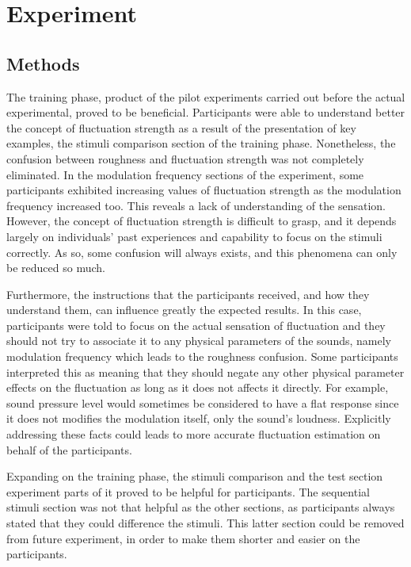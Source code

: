 \documentclass[../main.tex]{subfiles}
\begin{document}
\section{Experiment}

\subsection{Methods}

The training phase, product of the pilot experiments carried out before the
actual experimental, proved to be beneficial. Participants were able to
understand better the concept of fluctuation strength as a result of the
presentation of key examples, the stimuli comparison section of the training
phase. Nonetheless, the confusion between roughness and fluctuation strength was
not completely eliminated. In the modulation frequency sections of the
experiment, some participants exhibited increasing values of fluctuation
strength as the modulation frequency increased too. This reveals a lack of
understanding of the sensation. However, the concept of fluctuation strength is
difficult to grasp, and it depends largely on individuals' past experiences and
capability to focus on the stimuli correctly. As so, some confusion will always
exists, and this phenomena can only be reduced so much.

Furthermore, the instructions that the participants received, and how they
understand them, can influence greatly the expected results. In this case,
participants were told to focus on the actual sensation of fluctuation and they
should not try to associate it to any physical parameters of the sounds, namely
modulation frequency which leads to the roughness confusion. Some participants
interpreted this as meaning that they should negate any other physical parameter
effects on the fluctuation as long as it does not affects it directly. For
example, sound pressure level would sometimes be considered to have a flat
response since it does not modifies the modulation itself, only the sound's
loudness. Explicitly addressing these facts could leads to more accurate
fluctuation estimation on behalf of the participants.

Expanding on the training phase, the stimuli comparison and the test section
experiment parts of it proved to be helpful for participants. The sequential
stimuli section was not that helpful as the other sections, as participants
always stated that they could difference the stimuli. This latter section
could be removed from future experiment, in order to make them shorter and
easier on the participants.
\end{document}
